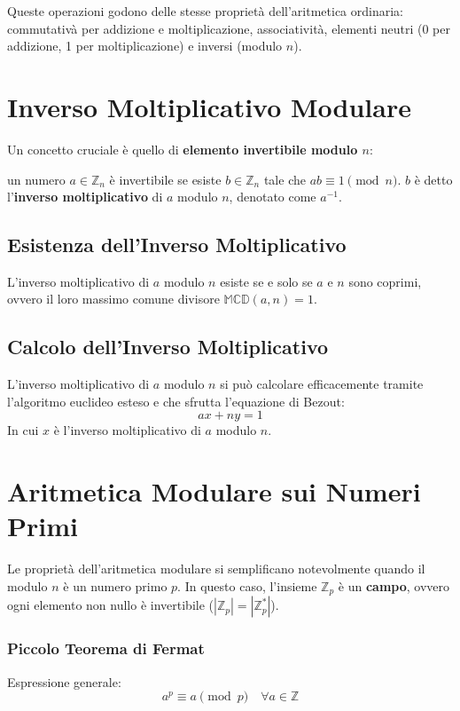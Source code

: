 \documentclass[a4paper,12pt]{report}
\begin{document}
Queste operazioni godono delle stesse proprietà dell'aritmetica ordinaria: commutativà per addizione e moltiplicazione, associatività, elementi neutri (0 per addizione, 1 per moltiplicazione) e inversi (modulo $n$).

\section{Inverso Moltiplicativo Modulare}

Un concetto cruciale è quello di \textbf{elemento invertibile modulo $n$}: 

un numero $a \in \mathbb{Z}_n$ è invertibile se esiste $b \in \mathbb{Z}_n$ tale che $ab \equiv 1 \pmod{n}$. $b$ è detto l'\textbf{inverso moltiplicativo} di $a$ modulo $n$, denotato come $a^{-1}$.

\subsection*{Esistenza dell'Inverso Moltiplicativo}
L'inverso moltiplicativo di $a$ modulo $n$ esiste se e solo se $a$ e $n$ sono coprimi, ovvero il loro massimo comune divisore $\mathbb{MCD}(a,n) = 1$. 

\subsection*{Calcolo dell'Inverso Moltiplicativo} \label{sec:inverso}
L'inverso moltiplicativo di $a$ modulo $n$ si può calcolare efficacemente tramite l'algoritmo euclideo esteso e che sfrutta l'equazione di Bezout:
\[ ax+ny=1 \]
In cui $x$ è l'inverso moltiplicativo di $a$ modulo $n$.

\section{Aritmetica Modulare sui Numeri Primi}

Le proprietà dell'aritmetica modulare si semplificano notevolmente quando il modulo $n$ è un numero primo $p$. In questo caso, l'insieme $\mathbb{Z}_p$ è un \textbf{campo}, ovvero ogni elemento non nullo è invertibile (\( |\mathbb{Z}_p| =|\mathbb{Z}_p^*| \)).

\subsubsection*{Piccolo Teorema di Fermat}
Espressione generale:
$$a^p \equiv a \pmod{p} \quad \forall a \in \mathbb{Z}$$
\end{document}
